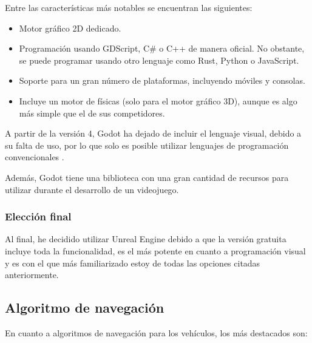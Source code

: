 \bigskip

Entre las características más notables se encuentran las siguientes:

\begin{itemize}
   \item Motor gráfico 2D dedicado. 
   \item Programación usando GDScript, C\# o C++ de manera oficial. No obstante, se puede programar usando otro lenguaje como Rust, Python o JavaScript. 
   \item Soporte para un gran número de plataformas, incluyendo móviles y consolas.
   \item Incluye un motor de físicas (solo para el motor gráfico 3D), aunque es algo más simple que el de sus competidores.
\end{itemize}

\bigskip 

A partir de la versión 4, Godot ha dejado de incluir el lenguaje visual, debido a su falta de uso, por lo que solo es posible utilizar lenguajes de programación convencionales \cite{godot-no-visual}.

\bigskip

Además, Godot tiene una biblioteca con una gran cantidad de recursos para utilizar durante el desarrollo de un videojuego.


\subsubsection{Elección final}

Al final, he decidido utilizar Unreal Engine debido a que la versión gratuita incluye toda la funcionalidad, es el más potente en cuanto a programación visual y es con el que más familiarizado estoy de todas las opciones citadas anteriormente.

\subsection{Algoritmo de navegación}
En cuanto a algoritmos de navegación para los vehículos, los más destacados son:

